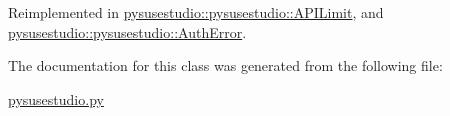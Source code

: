 Reimplemented in \hyperlink{classpysusestudio_1_1pysusestudio_1_1_a_p_i_limit_a0b841d2d35e949aafd2d2b2c7eb35bee}{pysusestudio::pysusestudio::APILimit}, and \hyperlink{classpysusestudio_1_1pysusestudio_1_1_auth_error_a530b3891fcdb5847996cc733eb0ecf28}{pysusestudio::pysusestudio::AuthError}.

The documentation for this class was generated from the following file:\begin{DoxyCompactItemize}
\item 
\hyperlink{pysusestudio_8py}{pysusestudio.py}\end{DoxyCompactItemize}
